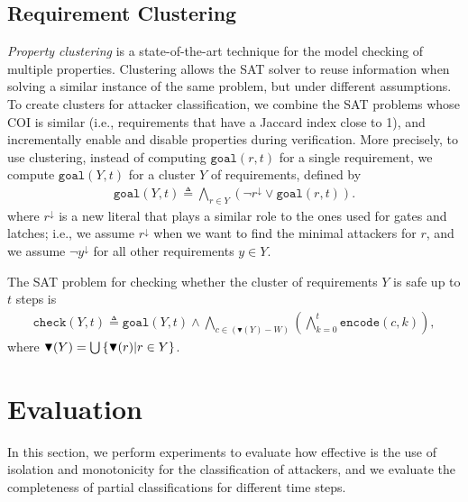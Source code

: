 {\subsection{Requirement Clustering}
\emph{Property clustering} \cite{ToSplitOrToGroup,HandbookOfSatisfiability,OptimizedModelCheckingOfMultipleProperties} is a state-of-the-art technique for the model checking of multiple properties. Clustering allows the SAT solver to reuse information when solving a similar instance of the same problem, but under different assumptions. To create clusters for attacker classification, we combine the SAT problems whose COI is similar (i.e., requirements that have a Jaccard index close to 1), and incrementally enable and disable properties during verification. More precisely, to use clustering, instead of computing $\mathtt{goal}(r,t)$ for a single requirement, we compute $\mathtt{goal}(Y,t)$ for a cluster $Y$ of requirements, defined by 
\begin{align}
\mathtt{goal}(Y,t) \triangleq \bigwedge_{r\in Y} (\lnot r^\downarrow \lor \mathtt{goal}(r,t)).
\end{align}
where $r^\downarrow$ is a new literal that plays a similar role to the ones used for gates and latches; i.e., we assume $r^\downarrow$ when we want to find the minimal attackers for $r$, and we assume $\lnot y^\downarrow$ for all other requirements $y \in Y$. 

The SAT problem for checking whether the cluster of requirements $Y$ is safe up to $t$ steps is
\begin{align} 
\label{eq:MasterEq}
\mathtt{check}(Y,t)\triangleq\mathtt{goal}(Y,t)\land\! \bigwedge_{c\in (\blacktriangledown(Y)- W)}\left( \bigwedge_{k=0}^{t}{\mathtt{encode}(c,k)}\right),
\end{align}
where $\blacktriangledown(Y)=\bigcup \left\{\blacktriangledown(r)| r\in Y\right\}$.

\section{Evaluation}
\label{sec:evaluation}
In this section, we perform experiments to evaluate how effective is the use of isolation and monotonicity for the classification of attackers, and we evaluate the completeness of partial classifications for different time steps. 

}
